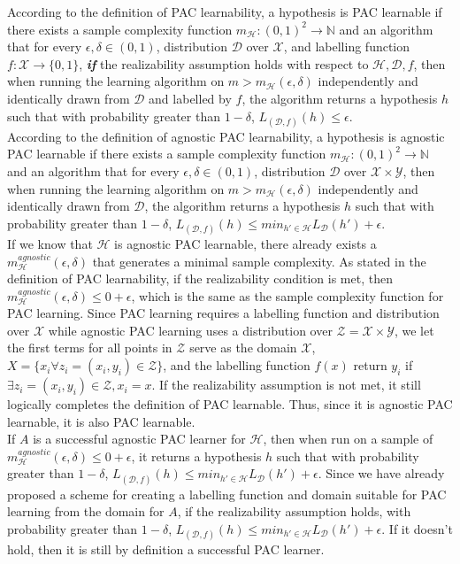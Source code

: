 \documentclass[12pt]{article}
\begin{document}
\begin{enumerate}
    According to the definition of PAC learnability, a hypothesis is PAC learnable if there exists a sample complexity function $m_\mathcal{H}:(0,1)^2\rightarrow\mathbb{N}$ and an algorithm that for every $\epsilon,\delta\in(0,1)$, distribution $\mathcal{D}$ over $\mathcal{X}$, and labelling function $f:\mathcal{X}\rightarrow\{0,1\}$, \textbf{\textit{if}} the realizability assumption holds with respect to $\mathcal{H},\mathcal{D},f$, then when running the learning algorithm on $m>m_\mathcal{H}(\epsilon,\delta)$ independently and identically drawn from $\mathcal{D}$ and labelled by $f$, the algorithm returns a hypothesis $h$ such that with probability greater than $1-\delta$, $L_{(\mathcal{D},f)}(h)\leq\epsilon.$\\

    According to the definition of agnostic PAC learnability, a hypothesis is agnostic PAC learnable if there exists a sample complexity function $m_\mathcal{H}:(0,1)^2\rightarrow\mathbb{N}$ and an algorithm that for every $\epsilon,\delta\in(0,1)$, distribution $\mathcal{D}$ over $\mathcal{X}\times\mathcal{Y}$, then when running the learning algorithm on $m>m_\mathcal{H}(\epsilon,\delta)$ independently and identically drawn from $\mathcal{D}$, the algorithm returns a hypothesis $h$ such that with probability greater than $1-\delta$, $L_{(\mathcal{D},f)}(h)\leq min_{h'\in\mathcal{H}}L_\mathcal{D}(h')+\epsilon$.\\

    If we know that $\mathcal{H}$ is agnostic PAC learnable, there already exists a $m_{\mathcal{H}}^{agnostic}(\epsilon,\delta)$ that generates a minimal sample complexity. As stated in the definition of PAC learnability, if the realizability condition is met, then $m_\mathcal{H}^{agnostic}(\epsilon,\delta)\leq 0+\epsilon$, which is the same as the sample complexity function for PAC learning. Since PAC learning requires a labelling function and distribution over $\mathcal{X}$ while agnostic PAC learning uses a distribution over $\mathcal{Z}=\mathcal{X}\times\mathcal{Y}$, we let the first terms for all points in $\mathcal{Z}$ serve as the domain $\mathcal{X}$, $X=\{x_i \forall z_i=(x_i,y_i)\in\mathcal{Z}\}$, and the labelling function $f(x)$ return $y_i$ if $\exists z_i=(x_i,y_i)\in\mathcal{Z},x_i=x$. If the realizability assumption is not met, it still logically completes the definition of PAC learnable. Thus, since it is agnostic PAC learnable, it is also PAC learnable.\\

    If $A$ is a successful agnostic PAC learner for $\mathcal{H}$, then when run on a sample of $m_\mathcal{H}^{agnostic}(\epsilon,\delta)\leq 0+\epsilon$, it returns a hypothesis $h$ such that with probability greater than $1-\delta$, $L_{(\mathcal{D},f)}(h)\leq min_{h'\in\mathcal{H}}L_\mathcal{D}(h')+\epsilon$. Since we have already proposed a scheme for creating a labelling function and domain suitable for PAC learning from the domain for $A$, if the realizability assumption holds, with probability greater than $1-\delta$, $L_{(\mathcal{D},f)}(h)\leq min_{h'\in\mathcal{H}}L_\mathcal{D}(h')+\epsilon$. If it doesn't hold, then it is still by definition a successful PAC learner.


\end{enumerate}
\end{document}
